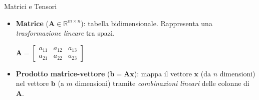 \documentclass[aspectratio=169, 10pt]{beamer}
\begin{document}
\begin{frame}{Matrici e Tensori}
    \begin{itemize}
        \setlength{\itemsep}{0.4cm} 
        
        \item 
        \begin{minipage}[c]{0.58\linewidth}
            \textbf{Matrice} ($\mathbf{A} \in \mathbb{R}^{m \times n}$): tabella bidimensionale. Rappresenta una \emph{trasformazione lineare} tra spazi.
        \end{minipage}
        \hfill
        \begin{minipage}[c]{0.38\linewidth}
            \centering
            $ \mathbf{A} = 
            \begin{bmatrix} 
                a_{11} & a_{12} & a_{13} \\ 
                a_{21} & a_{22} & a_{23} 
            \end{bmatrix} $
        \end{minipage}

        \item 
        \begin{minipage}[c]{0.58\linewidth}
            \textbf{Prodotto matrice-vettore} ($\mathbf{b} = \mathbf{A}\mathbf{x}$): mappa il vettore $\mathbf{x}$ (da $n$ dimensioni) nel vettore $\mathbf{b}$ (a $m$ dimensioni) tramite \emph{combinazioni lineari} delle colonne di $\mathbf{A}$.
        \end{minipage}
        \hfill
        \begin{minipage}[c]{0.38\linewidth}
            \centering
        \end{minipage}


\end{itemize}
\end{frame}
\end{document}
